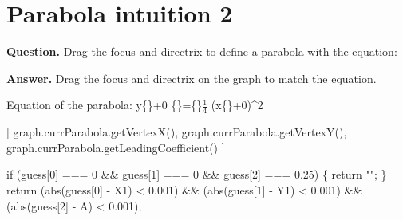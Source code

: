 \documentclass{article}
\begin{document}
\section*{Parabola intuition 2}
\textbf{Question.} Drag the focus and directrix to define a
                    parabola with the equation:

\textbf{Answer.} Drag the focus and directrix on the graph to match the equation.
                        
                            Equation of the parabola:
                            y\{\}+0
                            \{\}=\{\}$\frac{1}{4}$
                            (x\{\}+0)\textasciicircum{}2
                        
                    

                    [
                        graph.currParabola.getVertexX(),
                        graph.currParabola.getVertexY(),
                        graph.currParabola.getLeadingCoefficient()
                    ]

                    
                        if (guess[0] === 0 \&\& guess[1] === 0 \&\& guess[2] === 0.25) \{
                            return "";
                        \}
                        return (abs(guess[0] - X1) < 0.001) \&\& (abs(guess[1] - Y1) < 0.001) \&\& (abs(guess[2] - A) < 0.001);
\end{document}
